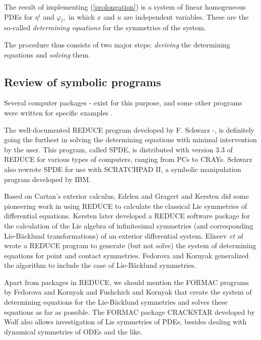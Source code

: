 \nopagebreak
The result of implementing (\ref{prolongation}) is a system
of linear homogeneous PDEs
for $\eta ^i $ and $\varphi _l ,$ in which $x$ and $u$ are independent
variables. 
These are the so-called {\em determining equations} for the symmetries of the
system.

\nopagebreak
The procedure thus consists of two major steps:
{\em deriving} the determining equations and {\em solving} them.

\subsection{Review of symbolic programs}
\nopagebreak
Several computer packages
\cite{schwarzsiam,schwarzprogram1}-\cite{champagneprogram}
exist for this purpose, and some other programs were written for specific
examples \cite{rosencransprogram}.

\nopagebreak
The well-documented REDUCE program developed by F. Schwarz
\cite{schwarzsiam,schwarzprogram1}-\cite{schwarzprogram4},
is definitely going the furthest in 
solving the determining equations with minimal intervention by the user.
This program, called SPDE, is distributed with version 3.3 of REDUCE
for various types of computers, ranging from PCs to CRAYs.
Schwarz also rewrote SPDE 
\cite{schwarzsiam,schwarzprogram4} for use with SCRATCHPAD II, a 
symbolic manipulation program developed by IBM.

\nopagebreak
Based on Cartan's exterior calculus, Edelen \cite{edelenprogram} and
Gragert and Kersten \cite{gragertetalprogram} did some pioneering work
in using REDUCE to calculate the classical Lie symmetries of differential
equations.
Kersten \cite{kerstenprogram1,kerstenprogram2} later developed a 
REDUCE software package for the
calculation of the Lie algebra of infinitesimal symmetries (and corresponding
Lie-B\"{a}cklund transformations) of an exterior differential system.
Eliseev {\em et al} \cite{eliseevprogram} wrote a REDUCE program
to generate (but not solve) the system of determining equations for 
point and contact symmetries.
Fedorova and Kornyak \cite{fedorovakornyakprogram1} generalized the 
algorithm to include the case of Lie-B\"{a}cklund symmetries.

\nopagebreak
Apart from packages in REDUCE, we should mention the FORMAC programs by
Fedorova and Kornyak \cite{fedorovakornyakprogram2} and Fushchich and
Kornyak \cite{fushchichkornyakprogram} that create the system of 
determining equations for the Lie-B\"{a}cklund symmetries and solves these
equations as far as possible. The FORMAC package CRACKSTAR developed by
Wolf \cite{wolfprogram} also allows investigation of Lie symmetries of
PDEs, besides dealing with dynamical symmetries of ODEs and the like.

